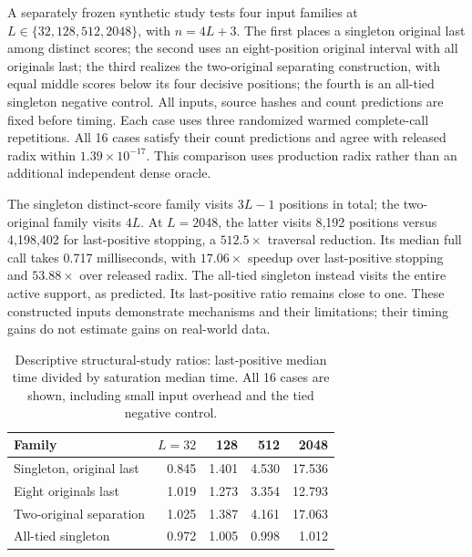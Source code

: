 A separately frozen synthetic study tests four input families at
$L\in\{32,128,512,2048\}$, with $n=4L+3$. The first places a singleton
original last among distinct scores; the second uses an eight-position
original interval with all originals last; the third realizes the
two-original separating construction, with equal middle scores below its
four decisive positions; the fourth is an all-tied singleton negative
control. All inputs, source hashes and count predictions are fixed before
timing. Each case uses three randomized warmed complete-call repetitions.
All 16 cases satisfy their count predictions and agree with released radix
within $1.39\times10^{-17}$. This comparison uses production radix rather
than an additional independent dense oracle.

The singleton distinct-score family visits $3L-1$ positions in total;
the two-original family visits $4L$. At $L=2048$, the latter visits 8,192
positions versus 4,198,402 for last-positive stopping, a $512.5\times$
traversal reduction. Its median full call takes 0.717 milliseconds, with
$17.06\times$ speedup over last-positive stopping and $53.88\times$ over
released radix. The all-tied singleton instead visits the entire active
support, as predicted. Its last-positive ratio remains close to one.
These constructed inputs demonstrate mechanisms and their limitations;
their timing gains do not estimate gains on real-world data.

\begin{table}[t]
\centering
\footnotesize
\setlength{\tabcolsep}{3.5pt}
\begin{tabular}{lrrrr}
\toprule
Family & $L=32$ & 128 & 512 & 2048\\
\midrule
Singleton, original last & 0.845 & 1.401 & 4.530 & 17.536\\
Eight originals last & 1.019 & 1.273 & 3.354 & 12.793\\
Two-original separation & 1.025 & 1.387 & 4.161 & 17.063\\
All-tied singleton & 0.972 & 1.005 & 0.998 & 1.012\\
\bottomrule
\end{tabular}
\caption{Descriptive structural-study ratios: last-positive median time
divided by saturation median time. All 16 cases are shown, including small
input overhead and the tied negative control.}
\label{tab:structural-runtime}
\end{table}
